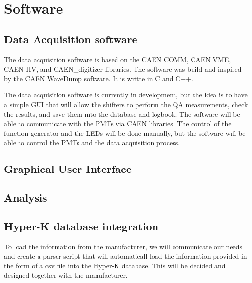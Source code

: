 \documentclass[12pt,a4paper]{article}
\begin{document}
\section{Software}

\subsection{Data Acquisition software}

The data acquisition software is based on the CAEN COMM, CAEN VME, CAEN HV, and CAEN\_digitizer libraries. The software was build and inspired by the CAEN WaveDump software. It is writte in C and C++.

The data acquisition software is currently in development, but the idea is to have a simple GUI that will allow the shifters to perform the QA measurements, check the results, and save them into the database and logbook. The software will be able to communicate with the PMTs via CAEN libraries. The control of the function generator and the LEDs will be done manually, but the software will be able to control the PMTs and the data acquisition process.

\subsection{Graphical User Interface}

\subsection{Analysis}

\subsection{Hyper-K database integration}
To load the information from the manufacturer, we will communicate our needs and create a parser script that will automaticall load the information provided in the form of a csv file into the Hyper-K database. This will be decided and designed together with the manufacturer.

\end{document}
